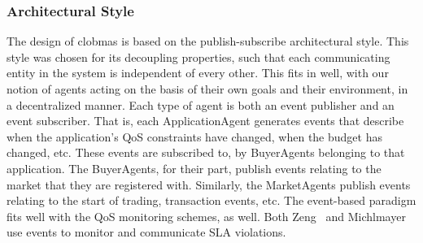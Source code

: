 \documentclass[10pt,journal,compsoc]{IEEEtran}
\begin{document}
\subsubsection{Architectural Style} The design of clobmas is based on the publish-subscribe architectural style. This style was chosen for its decoupling properties, such that each communicating entity in the system is independent of every other. This fits in well, with our notion of agents acting on the basis of their own goals and their environment, in a decentralized manner. Each type of agent is both an event publisher and an event subscriber. That is, each ApplicationAgent generates events that describe when the application's QoS constraints have changed, when the budget has changed, etc. These events are subscribed to, by BuyerAgents belonging to that application. The BuyerAgents, for their part, publish events relating to the market that they are registered with. Similarly, the MarketAgents publish events relating to the start of trading, transaction events, etc. The event-based paradigm fits well with the QoS monitoring schemes, as well. Both Zeng~\cite{Zeng2007Monitoring} and Michlmayer~\cite{Michlmayr2009Comprehensive} use events to monitor and communicate SLA violations. 
%

%
\end{document}
